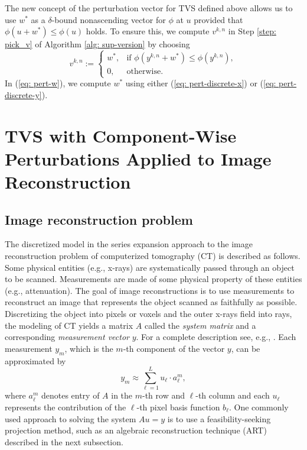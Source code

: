 \documentclass[smallextended]{svjour3}      %
\begin{document}
The new concept of the perturbation vector for TVS defined above allows us to use $w^{*}$ as a $\delta$-bound nonascending vector for $\phi$ at $u$ provided that $\phi(u+w^{*})\leq\phi(u)$ holds. To ensure this, we compute $v^{k,n}$ in Step \ref{step: pick_v} of Algorithm \ref{alg: sup-version} by choosing
\begin{equation}
v^{k,n}:=\begin{cases}
w^{*}, & \mbox{if }\phi(y^{k,n}+w^{*})\leq\phi(y^{k,n}),\\
0, & \mbox{otherwise.}
\end{cases}\label{eq: pert-w}
\end{equation}
In (\ref{eq: pert-w}), we compute $w^{*}$ using either (\ref{eq: pert-discrete-x}) or (\ref{eq: pert-discrete-y}).


\section{TVS with Component-Wise Perturbations Applied to Image Reconstruction\label{sec:A-computational-example}}

\subsection{Image reconstruction problem}

The discretized model in the series expansion approach to the image reconstruction problem of computerized tomography (CT) is described as follows. Some physical entities (e.g., x-rays) are systematically passed through an object to be scanned. Measurements are made of some physical property of these entities (e.g., attenuation). The goal of image reconstructions is to use measurements to reconstruct an image that represents the object scanned as faithfully as possible. Discretizing the object into pixels or voxels and the outer x-rays field into rays, the modeling of CT yields a matrix $A$ called the \textit{system 	matrix} and a corresponding \textit{measurement vector }$y$. For a complete description see, e.g., \cite{herman2009book}. Each measurement $y_{m}$, which is the $m$-th component of the vector $y$, can be approximated by
\begin{equation}
y_{m}\approx\sum_{\ell=1}^{L}u_{\ell}\cdot a_{\ell}^{m},\label{eq: series-def}
\end{equation}
where $a_{\ell}^{m}$ denotes entry of $A$ in the $m$-th row and $\ell$-th column and each $u_{\ell}$ represents the contribution of the $\ell$-th pixel basis function $b_{\ell}$. One commonly used approach to solving the system $Au=y$ is to use a feasibility-seeking projection method, such as an algebraic reconstruction technique (ART) described in the next subsection.
\end{document}
